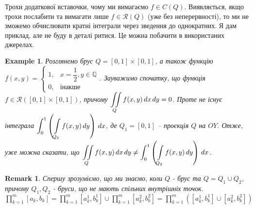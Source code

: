 \documentclass[a4paper, 10pt]{article}
\theoremstyle{theoremdd}
\theoremstyle{theoremdd}
\theoremstyle{theoremdd}
\theoremstyle{theoremdd}
\theoremstyle{theoremdd}
\newtheorem{example}[theorem]{Example}
\theoremstyle{theoremdd}
\theoremstyle{theoremdd}
\theoremstyle{theoremdd}
\theoremstyle{theoremdd}
\theoremstyle{theoremdd}
\theoremstyle{theoremdd}
\newtheorem{remark}[theorem]{Remark}
\theoremstyle{theoremdd}
\theoremstyle{theoremdd}
\theoremstyle{theoremdd}
\theoremstyle{theoremdd}
\begin{document}
\noindent
Трохи додаткової вставочки, чому ми вимагаємо $f \in C(Q)$. Виявляється, якщо трохи послабити та вимагати лише $f \in \mathcal{R}(Q)$ (уже без неперервності), то ми не зможемо обчислювати кратні інтеграли через зведення до однократних. Я дам приклад, але не буду в деталі ритися. Це можна побачити в використаних джерелах.

\begin{example}
Розглянемо брус $Q = [0,1] \times [0,1]$, а також функцію $f(x,y) = \begin{cases} 1, & x = \dfrac{1}{2}, y \in \mathbb{Q} \\ 0, & \text{інакше} \end{cases}$. Зауважимо спочатку, що функція $f \in \mathcal{R}([0,1] \times [0,1])$, причому $\displaystyle\iint\displaylimits_Q f(x,y)\,dx\,dy = 0$. Проте не існує інтеграла $\displaystyle\int_0^1 \left( \int\displaylimits_{Q_2} f(x,y)\,dy \right)\,dx$, де $Q_1 = [0,1]$ -- проєкція $Q$ на $OY$. Отже, уже можна сказати, що $\displaystyle\iint\displaylimits_Q f(x,y)\,dx\,dy \neq \int_0^1 \left( \int\displaylimits_{Q_2} f(x,y)\,dy \right)\,dx$. 
\end{example}

\iffalse
\begin{remark}
Пояснення нерівності $\overset{?}{\leq}$ під час доведення наведу на просішому прикладі, на $\mathbb{R}^2$.\\
$U(f,\lambda) \geq \displaystyle\sum_{\substack{0 \leq v_1 \leq n_1-1 \\ 0 \leq v_2 \leq n_2-1}} \sup_{(x,y) \in Q(v_1,v_2)} f(x,y) \Delta x(v_1) \Delta y(v_2) = \sum_{v_2=0}^{n_2-1} \left( \sum_{v_1=0}^{n_1-1} \sup_{(x,y) \in Q(v_1,v_2)} f(x,y) \Delta x(v_1) \right) \Delta y(v_2)$
\end{remark}
\fi

\iffalse
\begin{remark}
Спершу зрозуміємо, що ми знаємо, коли $Q$ - брус та $Q = Q_1 \cup Q_2$, причому $Q_1,Q_2$ - бруси, що не мають спільних внутрішніх точок.\\
$\displaystyle\prod_{k=1}^m [a_k,b_k] = \prod_{k=1}^m [a_k^1,b_k^1] \cup \prod_{k=1}^m [a_k^2,b_k^2] = \prod_{k=1}^m ([a_k^1,b_k^1] \cup [a_k^2,b_k^2])$
\end{remark}
\end{document}
